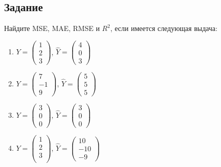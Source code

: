 \documentclass[11pt, a4paper]{extarticle}
\begin{document}
\subsection{Задание}
Найдите MSE, MAE, RMSE и $R^2$, если имеется следующая выдача:
\begin{multicols}{2}
\begin{enumerate}[label=\alph*)]
	\item $Y = \begin{pmatrix}
	1 \\
	2 \\
	3
	\end{pmatrix}$, $\hat{Y} = \begin{pmatrix}
	4 \\
	0 \\
	3
	\end{pmatrix}$
	\item $Y = \begin{pmatrix}
	7 \\
	-1 \\
	9
	\end{pmatrix}$, $\hat{Y} = \begin{pmatrix}
	5 \\
	5 \\
	5
	\end{pmatrix}$
	\item $Y = \begin{pmatrix}
		3 \\
		0 \\
		0
	\end{pmatrix}$, $\hat{Y} = \begin{pmatrix}
	3 \\
	0 \\
	0
	\end{pmatrix}$
	\item $Y = \begin{pmatrix}
	1 \\
	2 \\
	3 \\
	\end{pmatrix}$, $\hat{Y} = \begin{pmatrix}
	10 \\
	-10 \\
	-9
	\end{pmatrix}$
\end{enumerate}
\end{multicols}
	
\end{document}
